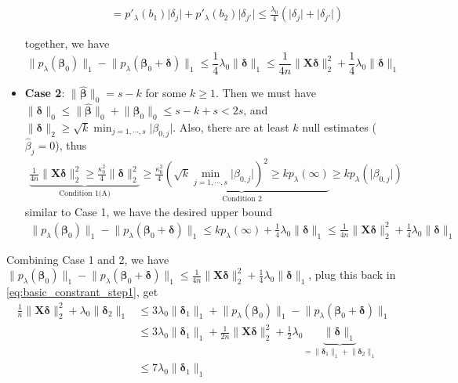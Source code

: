 \documentclass[twoside]{article}
\begin{document}
\begin{itemize}
\begin{itemize}
\begin{align*}
            &= p'_{\lambda}(b_1)\lvert \delta_j \rvert + p'_{\lambda}(b_2)\lvert \delta_{j'} \rvert \leq \frac{\lambda_0}{4}\left( \lvert \delta_j \rvert + \lvert \delta_{j'} \rvert \right)
        \end{align*}
    \end{itemize}
    together, we have $$ \lVert p_{\lambda}({\boldsymbol{\beta}_0}) \rVert _1 -  \lVert p_{\lambda}( \boldsymbol{\beta}_0+\boldsymbol{\delta}) \rVert _1 \leq \frac{1}{4}\lambda_0\lVert\boldsymbol{\delta}\rVert _1 \leq \frac{1}{4n}\lVert \mathbf{X}\boldsymbol{\delta} \rVert^2_2+\frac{1}{4}\lambda_0\lVert\boldsymbol{\delta} \rVert _1 $$
    \item \textbf{Case 2}: $\lVert \hat{\boldsymbol{\beta}} \rVert _0 = s-k$ for some $k\geq 1$. Then we must have $\lVert \boldsymbol{\delta} \rVert _0 \leq \lVert \hat{\boldsymbol{\beta}} \rVert _0 + \lVert \boldsymbol{\beta}_0 \rVert _0\leq s -k+s <2s$, and $\lVert \boldsymbol{\delta} \rVert _2 \geq \sqrt{k}\min_{j=1,\cdots,s}\lvert \beta_{0,j} \rvert$. Also, there are at least $k$ null estimates ($\hat{\beta}_j=0$), thus
    \begin{align*}
        \underbrace{\frac{1}{4n}\lVert \mathbf{X} \boldsymbol{\delta} \rVert^2_2 \geq \frac{\kappa_0^2}{4} \lVert \boldsymbol{\delta} \rVert^2_2}_{\text{Condition 1(A)}} \geq \underbrace{\frac{\kappa_0^2}{4}\left( \sqrt{k}\min_{j=1,\cdots,s}\lvert \beta_{0,j}\rvert \right)^2 \geq kp_{\lambda}(\infty)}_{\text{Condition 2}} \geq k p_{\lambda}(\lvert \beta_{0,j} \rvert)
    \end{align*}
    similar to Case 1, we have the desired upper bound 
    \begin{align*}
        \lVert p_{\lambda}({\boldsymbol{\beta}_0}) \rVert _1 -  \lVert p_{\lambda}( \boldsymbol{\beta}_0+\boldsymbol{\delta}) \rVert _1 \leq  kp_{\lambda}(\infty) + \frac{1}{4}\lambda_0\lVert\boldsymbol{\delta}\rVert _1 \leq \frac{1}{4n}\lVert \mathbf{X}\boldsymbol{\delta} \rVert^2_2+\frac{1}{4}\lambda_0\lVert\boldsymbol{\delta} \rVert _1
    \end{align*}
\end{itemize}
Combining Case 1 and 2, we have $\lVert p_{\lambda}({\boldsymbol{\beta}_0}) \rVert _1 -  \lVert p_{\lambda}( \boldsymbol{\beta}_0+\boldsymbol{\delta}) \rVert _1 \leq \frac{1}{4n}\lVert \mathbf{X}\boldsymbol{\delta} \rVert^2_2+\frac{1}{4}\lambda_0\lVert\boldsymbol{\delta} \rVert _1$, plug this back in \ref{eq:basic_constrant_step1}, get 
\begin{align*}
    \frac{1}{n}\lVert \mathbf{X}\boldsymbol{\delta} \rVert ^2_2 + \lambda_0\lVert \boldsymbol{\delta}_2 \rVert _1 &\leq 3\lambda_0 \lVert \boldsymbol{\delta}_1 \rVert _1+ \lVert p_{\lambda}({\boldsymbol{\beta}_0}) \rVert _1 -  \lVert p_{\lambda}( \boldsymbol{\beta}_0+\boldsymbol{\delta}) \rVert _1\\
     & \leq 3\lambda_0 \lVert \boldsymbol{\delta}_1 \rVert _1 + \frac{1}{2n}\lVert \mathbf{X}\boldsymbol{\delta} \rVert^2_2+\frac{1}{2}\lambda_0\underbrace{\lVert\boldsymbol{\delta} \rVert _1}_{= \lVert\boldsymbol{\delta}_1 \rVert _1 + \lVert\boldsymbol{\delta}_2 \rVert _1} \\
     & \leq 7\lambda_0 \lVert \boldsymbol{\delta}_1 \rVert _1
\end{align*}
\end{document}
